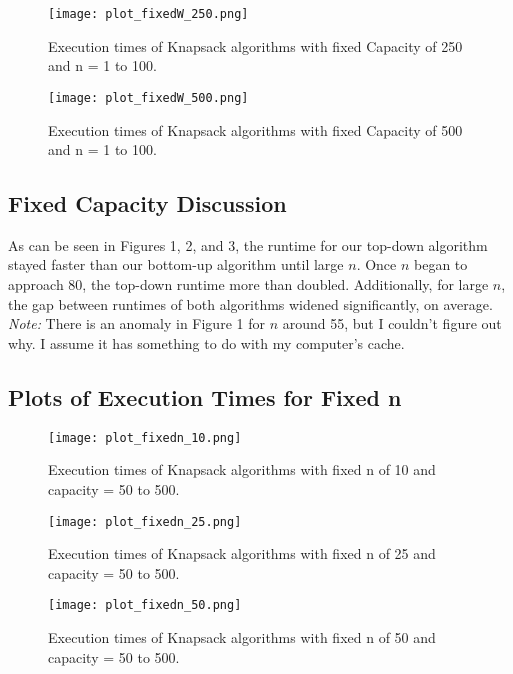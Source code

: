 \documentclass{article}
\begin{document}
\begin{figure}[h!]
    \centering
    \texttt{[image: plot\_fixedW\_250.png]}
    \caption{Execution times of Knapsack algorithms with fixed Capacity of 250 and n = 1 to 100.}
\end{figure}

\newpage
\begin{figure}[h!]
    \centering
    \texttt{[image: plot\_fixedW\_500.png]}
    \caption{Execution times of Knapsack algorithms with fixed Capacity of 500 and n = 1 to 100.}
\end{figure}

\subsection{Fixed Capacity Discussion}
As can be seen in Figures 1, 2, and 3, the runtime for our top-down algorithm stayed faster than our bottom-up algorithm until large $n$. Once $n$ began to approach 80, the top-down runtime more than doubled. Additionally, for large $n$, the gap between runtimes of both algorithms widened significantly, on average. \\
\textit{Note:} There is an anomaly in Figure 1 for $n$ around 55, but I couldn't figure out why. I assume it has something to do with my computer's cache. 

\subsection{Plots of Execution Times for Fixed n}
\begin{figure}[h!]
    \centering
    \texttt{[image: plot\_fixedn\_10.png]}
    \caption{Execution times of Knapsack algorithms with fixed n of 10 and capacity = 50 to 500.}
\end{figure}

\begin{figure}[h!]
    \centering
    \texttt{[image: plot\_fixedn\_25.png]}
    \caption{Execution times of Knapsack algorithms with fixed n of 25 and capacity = 50 to 500.}
\end{figure}

\begin{figure}[h!]
    \centering
    \texttt{[image: plot\_fixedn\_50.png]}
    \caption{Execution times of Knapsack algorithms with fixed n of 50 and capacity = 50 to 500.}
\end{figure}
\end{document}

